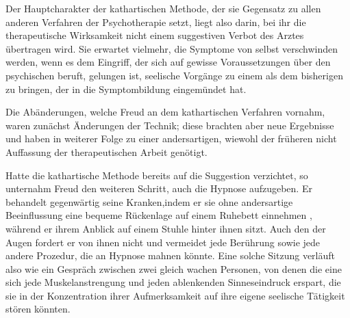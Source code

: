 \documentclass[twoside=true,titlepage=false,open=any, parskip=never, fontsize=10pt, headings=small, chapterprefix=false, appendixprefix=false]{scrbook}
\begin{document}
            
        \pstart
        Der Hauptcharakter der kathartischen Methode, der sie  Gegensatz zu allen anderen Verfahren der Psychotherapie setzt, liegt
               also darin,  bei ihr die therapeutische Wirksamkeit nicht einem suggestiven Verbot des
               Arztes übertragen wird. Sie erwartet vielmehr,  die Symptome von selbst verschwinden werden, wenn es dem Eingriff, der
               sich auf gewisse Voraussetzungen über den psychischen  beruft, gelungen ist, seelische Vorgänge zu einem  als dem bisherigen  zu bringen, der in die Symptombildung eingemündet hat.
        \pend
    
            
        \pstart
        Die Abänderungen, welche Freud an dem kathartischen
                  Verfahren  vornahm, waren zunächst Änderungen der Technik; diese brachten
               aber neue Ergebnisse und haben in weiterer Folge zu einer andersartigen, wiewohl
               der früheren nicht  Auffassung der therapeutischen Arbeit genötigt.
        \pend
    
            
        \pstart
        Hatte die kathartische Methode bereits auf die Suggestion verzichtet, so unternahm Freud den weiteren Schritt, auch die Hypnose aufzugeben. Er behandelt
                  gegenwärtig seine Kranken,indem er sie ohne andersartige Beeinflussung eine bequeme Rückenlage auf
               einem Ruhebett einnehmen , während er
                ihrem Anblick  auf einem Stuhle hinter ihnen sitzt. Auch den  der Augen fordert er von ihnen nicht und vermeidet jede Berührung sowie
               jede andere Prozedur, die an Hypnose mahnen könnte. Eine solche Sitzung verläuft
               also wie ein Gespräch zwischen zwei gleich wachen Personen, von denen die
               eine sich jede Muskelanstrengung und jeden ablenkenden Sinneseindruck
               erspart, die sie in der Konzentration ihrer Aufmerksamkeit auf ihre eigene
               seelische Tätigkeit stören könnten.
        \pend
    
\end{document}
